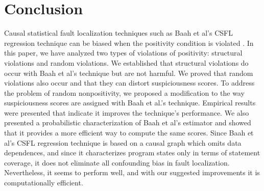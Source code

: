\section{Conclusion}
Causal statistical fault localization techniques such as Baah et al’s CSFL regression technique can be biased when the positivity condition is violated \cite{bai2015importance}.  In this paper, we have analyzed two types of violations of positivity: structural violations and random violations. We established that structural violations do occur with Baah et al’s technique but are not harmful.  We proved that random violations also occur and that they can distort suspiciousness scores.  To address the problem of random nonpositivity, we proposed a modification to the way suspiciousness scores are assigned with Baah et al.’s technique.  Empirical results were presented that indicate it improves the technique’s performance. We also presented a probabilistic characterization of Baah et al’s estimator and showed that it provides a more efficient way to compute the same scores. Since Baah et al’s CSFL regression technique is based on a causal graph which omits data dependences, and since it characterizes program states only in terms of statement coverage, it does not eliminate all confounding bias in fault localization.  Nevertheless, it seems to perform well, and with our suggested improvements it is computationally efficient.










